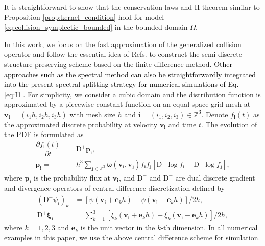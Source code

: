 \documentclass[preprint,1p,times]{elsarticle}
\theoremstyle{definition}
\theoremstyle{remark}
\newcommand{\tcb}[1]{\textcolor{black}{#1}}
\begin{document}
It is straightforward to show that the conservation laws and H-theorem similar to Proposition \ref{prop:kernel_condition} hold for model \eqref{eq:collision_symplectic_bounded} in the bounded domain $\Omega$. 

In this work, we focus on the fast approximation of the generalized collision operator and follow the essential idea of Refs. \cite{degond1994entropy, buet1999numerical} to construct the semi-discrete structure-preserving scheme based on the finite-difference method.
\tcb{Other approaches such as the spectral method can also be straightforwardly integrated into the present spectral splitting strategy for numerical simulations of Eq. \eqref{eq:I1}.}
For simplicity, we consider a cubic domain and the distribution function is approximated by a piecewise constant function on an equal-space grid mesh at $\boldsymbol{v}_{\boldsymbol{i}}=(i_{1}h, i_{2}h, i_{3}h)$ with mesh size $h$ and $\boldsymbol{i}=(i_{1}, i_{2}, i_{3}) \in \mathbb{Z}^{3}$.
Denote $f_{\boldsymbol{i}}(t)$ as the approximated discrete probability at velocity $\boldsymbol{v}_{\boldsymbol{i}}$ and time $t$.
The evolution of the PDF is formulated as
\begin{equation}
    \begin{aligned}
        \dfrac{\partial f_{\boldsymbol{i}}(t)}{\partial t} =& \mathrm{D}^{+} \boldsymbol{p}_{\boldsymbol{i}} , \\ %
        \boldsymbol{p}_{\boldsymbol{i}} =& h^{3} \sum_{\boldsymbol{j} \in \mathbb{Z}^{3}} \boldsymbol{\omega}(\boldsymbol{v}_{\boldsymbol{i}}, \boldsymbol{v}_{\boldsymbol{j}}) f_{\boldsymbol{i}} f_{\boldsymbol{j}} \left[ \mathrm{D}^{-} \log f_{\boldsymbol{i}} - \mathrm{D}^{-} \log f_{\boldsymbol{j}} \right] ,
    \end{aligned}
\end{equation}
where $\boldsymbol{p}_{\boldsymbol{i}}$ is the probability flux at $\boldsymbol{v}_{\boldsymbol{i}}$, and $\mathrm{D}^{-}$ and $\mathrm{D}^{+}$ are dual discrete gradient and divergence operators of central difference discretization defined by
\begin{equation}
    \begin{aligned}
        (\mathrm{D}^{-} \psi_{\boldsymbol{i}})_{k} &= [\psi(\boldsymbol{v}_{\boldsymbol{i}}+\boldsymbol{e}_{k}h) - \psi(\boldsymbol{v}_{\boldsymbol{i}}-\boldsymbol{e}_{k}h)]/2h , \\
        \mathrm{D}^{+} \boldsymbol{\xi}_{\boldsymbol{i}} &= \sum_{k=1}^{3} [\xi_{k}(\boldsymbol{v}_{\boldsymbol{i}}+\boldsymbol{e}_{k}h) - \xi_{k}(\boldsymbol{v}_{\boldsymbol{i}}-\boldsymbol{e}_{k}h)]/2h ,
    \end{aligned}
\end{equation}
where $k=1,2,3$ and $\boldsymbol{e}_{k}$ is the unit vector in the $k$-th dimension.
In all numerical examples in this paper, we use the above central difference scheme for simulation.
\end{document}
